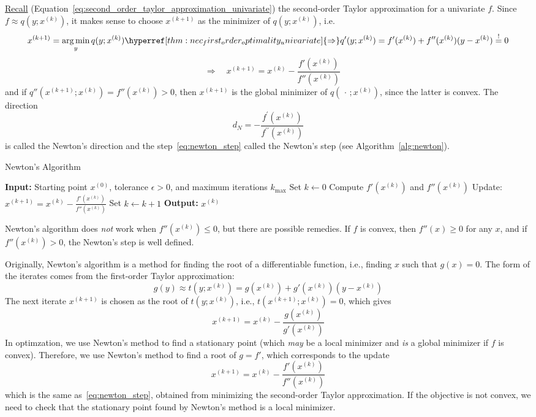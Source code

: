 \hyperref[eq:second_order_taylor_approximation_univariate]{Recall} (Equation~\ref{eq:second_order_taylor_approximation_univariate}) the second-order Taylor approximation for a univariate \(f\). 
Since \(f \approx q(y;x^{(k)})\), it makes sense to choose \(x^{(k+1)}\) as the minimizer of \(q(y;x^{(k)})\), i.e.
\[
x^{(k+1)}=\argmin_{y} q(y;x^{(k)}) \hyperref[thm:nec_first_order_optimality_univariate]{\Rightarrow} q'(y;x^{(k)}) = f'(x^{(k)})+f''(x^{(k)})(y-x^{(k)}) \overset{!}{=} 0 
\]
\begin{equation}\label{eq:newton_step}
\quad \Longrightarrow \quad x^{(k+1)}=x^{(k)}-\frac{f'(x^{(k)})}{f''(x^{(k)})} %
\end{equation}
and if \(q''(x^{(k+1)};x^{(k)}) = f''(x^{(k)}) > 0\), then \(x^{(k+1)}\) is the global minimizer of \(q(\, \cdot \,; x^{(k)})\), since the latter is convex. 
The direction
\[
d_{N}=-\frac{f^{\prime}\left(x^{(k)}\right)}{f^{\prime \prime}\left(x^{(k)}\right)}
\]
is called the Newton's direction and the step~\eqref{eq:newton_step} called the Newton's step (see Algorithm~\ref{alg:newton}).
\begin{algorithm}[H]
\caption{Newton's Algorithm}\label{alg:newton}
\begin{algorithmic}[1]
    \State \textbf{Input:} Starting point \(x^{(0)}\), tolerance \(\epsilon>0\), and maximum iterations \(k_{\max}\)
    \State Set \(k\gets0\)
        \State Compute \(f'(x^{(k)})\) and \(f''(x^{(k)})\)
        \State Update: \(x^{(k+1)}=x^{(k)}-\frac{f'(x^{(k)})}{f''(x^{(k)})}\)
        \State Set \(k\gets k+1\)
    \EndWhile
    \State \textbf{Output:} \(x^{(k)}\)
\end{algorithmic}
\end{algorithm}

\begin{remark}
Newton's algorithm does \emph{not} work when \(f''(x^{(k)}) \leq 0\), but there are possible remedies. If \(f\) is convex, then \(f''(x) \geq 0\) for any \(x\), and if \(f''(x^{(k)})>0\), the Newton's step is well defined.
\end{remark}

\begin{remark}
Originally, Newton's algorithm is a method for finding the root of a differentiable function, i.e., finding \(x\) such that \(g(x)=0\). The form of the iterates comes from the first-order Taylor approximation:
\[
g(y) \approx t(y;x^{(k)})=g(x^{(k)})+g'(x^{(k)})(y-x^{(k)})
\]
The next iterate \(x^{(k+1)}\) is chosen as the root of \(t(y;x^{(k)})\), i.e., \(t(x^{(k+1)};x^{(k)})=0\), which gives
\[
x^{(k+1)}=x^{(k)}-\frac{g(x^{(k)})}{g'(x^{(k)})}
\]
In optimzation, we use Newton's method to find a stationary point (which \emph{may} be a local minimizer and \emph{is} a global minimizer if \(f\) is convex). Therefore, we use Newton's method to find a root of \(g=f'\), which corresponds to the update
\[
x^{(k+1)}=x^{(k)}-\frac{f'(x^{(k)})}{f''(x^{(k)})}
\]
which is the same as~\eqref{eq:newton_step}, obtained from minimizing the second-order Taylor approximation. If the objective is not convex, we need to check that the stationary point found by Newton's method is a local minimizer.
\end{remark}

